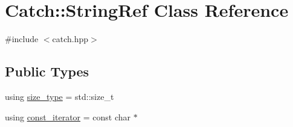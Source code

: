 \hypertarget{class_catch_1_1_string_ref}{}\section{Catch\+:\+:String\+Ref Class Reference}
\label{class_catch_1_1_string_ref}


{\ttfamily \#include $<$catch.\+hpp$>$}

\subsection*{Public Types}
\begin{DoxyCompactItemize}
\item 
using \mbox{\hyperlink{class_catch_1_1_string_ref_a06b4db8fc82b197004291cf370b2ba7c}{size\+\_\+type}} = std\+::size\+\_\+t
\item 
using \mbox{\hyperlink{class_catch_1_1_string_ref_ac3aa3d16f48b5429a480f823c504f93c}{const\+\_\+iterator}} = const char $\ast$
\end{DoxyCompactItemize}
